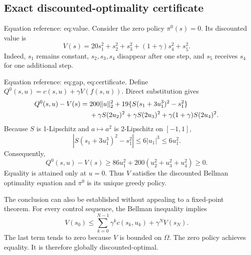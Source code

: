 \documentclass[10pt]{article}
\begin{document}
\subsection*{Exact discounted-optimality certificate}
Equation reference: eq:value. Consider the zero policy \(\pi^0(s)=0\). Its discounted value is \[
 V(s)=20s_1^2+s_2^2+s_3^2+(1+\gamma)s_4^2+s_5^2.\] Indeed, \(s_1\) remains constant, \(s_2,s_3,s_4\) disappear after one step, and \(s_5\) receives \(s_4\) for one additional step.\par
Equation reference: eq:gap, eq:certificate. Define \(Q^0(s,u)=c(s,u)+\gamma V(f(s,u))\). Direct substitution gives \[\begin{aligned}
 Q^0(s,u)-V(s)
 ={}&200\|u\|_2^2
 +19\{S(s_1+3u_1^3)^2-s_1^2\}\notag\\
 &+\gamma S(2u_2)^2+\gamma S(2u_3)^2
   +\gamma(1+\gamma)S(2u_4)^2. \end{aligned}\] Because \(S\) is 1-Lipschitz and \(a\mapsto a^2\) is 2-Lipschitz on \([-1,1]\), \[|S(s_1+3u_1^3)^2-s_1^2|
 \le6|u_1|^3\le6u_1^2.\] Consequently, \[
 Q^0(s,u)-V(s)
 \ge86u_1^2+200(u_2^2+u_3^2+u_4^2)\ge0.\] Equality is attained only at \(u=0\). Thus \(V\) satisfies the discounted Bellman optimality equation and \(\pi^0\) is its unique greedy policy.\par
The conclusion can also be established without appealing to a fixed-point theorem. For every control sequence, the Bellman inequality implies \[V(s_0)\le\sum_{k=0}^{N-1}\gamma^k c(s_k,u_k)+\gamma^N V(s_N).\] The last term tends to zero because \(V\) is bounded on \(\Omega\). The zero policy achieves equality. It is therefore globally discounted-optimal.\par
\end{document}

